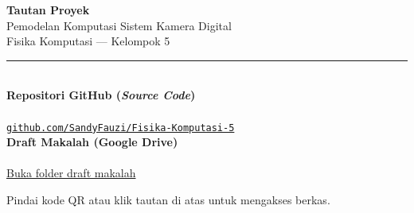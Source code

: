 \documentclass[12pt]{article}
\begin{document}
\begin{center}

{\LARGE\bfseries Tautan Proyek}\\[4pt]
{\large Pemodelan Komputasi Sistem Kamera Digital}\\[2pt]
{\large Fisika Komputasi --- Kelompok 5}\\[1.5em]
\rule{\linewidth}{0.6pt}\\[2.5em]

{\Large\bfseries Repositori GitHub \textnormal{(\textit{Source Code})}}\\[1.2em]
\\[1.2em]
\href{https://github.com/SandyFauzi/Fisika-Komputasi-5}%
{\large\texttt{github.com/SandyFauzi/Fisika-Komputasi-5}}\\[3em]

{\Large\bfseries Draft Makalah \textnormal{(Google Drive)}}\\[1.2em]
\\[1.2em]
\href{https://drive.google.com/drive/folders/12tDzCv-M5J5ZluB_qR3SLH_I3gEVZk5c?usp=sharing}%
{\large Buka folder draft makalah}

\vfill
{\small Pindai kode QR atau klik tautan di atas untuk mengakses berkas.}

\end{center}
\end{document}

